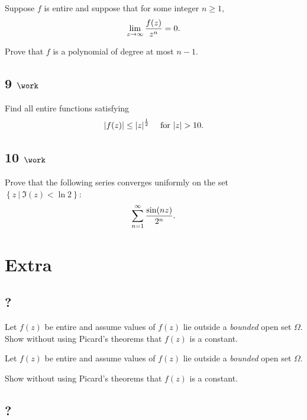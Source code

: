 Suppose \(f\) is entire and suppose that for some integer \(n\geq 1\),
\begin{align*}
\lim_{z\to \infty} {f(z) \over z^n} = 0
.\end{align*}

Prove that \(f\) is a polynomial of degree at most \(n-1\).

\hypertarget{work-40}{%
\subsection{\texorpdfstring{9
\(\work\)}{9 \textbackslash work}}\label{work-40}}

Find all entire functions satisfying
\begin{align*}
{\left\lvert {f(z)} \right\rvert} \leq {\left\lvert {z} \right\rvert}^{1\over 2} \quad\text{ for } {\left\lvert {z} \right\rvert} > 10
.\end{align*}

\hypertarget{work-41}{%
\subsection{\texorpdfstring{10
\(\work\)}{10 \textbackslash work}}\label{work-41}}

Prove that the following series converges uniformly on the set
\(\left\{{z {~\mathrel{\Big|}~}\Im(z) < \ln 2}\right\}\):
\begin{align*}
\sum_{n=1}^\infty {\sin(nz) \over 2^n}
.\end{align*}

\hypertarget{extra-1}{%
\section{Extra}\label{extra-1}}

\hypertarget{section-6}{%
\subsection{?}\label{section-6}}

Let \(f(z)\) be entire and assume values of \(f(z)\) lie outside a
\emph{bounded} open set \(\Omega\). Show without using Picard's theorems
that \(f(z)\) is a constant.

Let \(f(z)\) be entire and assume values of \(f(z)\) lie outside a
\emph{bounded} open set \(\Omega\).

Show without using Picard's theorems that \(f(z)\) is a constant.

\hypertarget{section-7}{%
\subsection{?}\label{section-7}}


